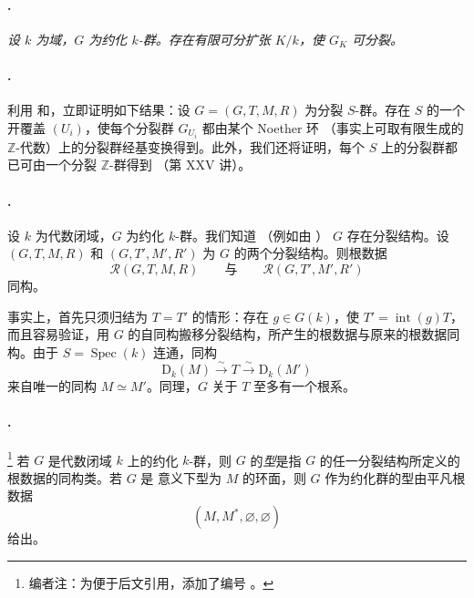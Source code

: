 \paragraph{.}
\textit{设 \(k\) 为域，\(G\) 为约化 \(k\)-群。存在有限可分扩张 \(K/k\)，使 \(G_K\) 可分裂。}

\paragraph{.}
利用  和，立即证明如下结果：设 \(G=(G,T,M,R)\) 为分裂 \(S\)-群。存在 \(S\) 的一个开覆盖 \((U_i)\)，使每个分裂群 \(G_{U_i}\) 都由某个 Noether 环 \textup{（事实上可取有限生成的 \(\mathbb Z\)-代数）}上的分裂群经基变换得到。此外，我们还将证明，每个 \(S\) 上的分裂群都已可由一个分裂 \(\mathbb Z\)-群得到 \textup{（第 XXV 讲）}。

\paragraph{.}
设 \(k\) 为代数闭域，\(G\) 为约化 \(k\)-群。我们知道 \textup{（例如由 ）} \(G\) 存在分裂结构。设 \((G,T,M,R)\) 和 \((G,T',M',R')\) 为 \(G\) 的两个分裂结构。则根数据
\[
  \mathcal R(G,T,M,R)
  \qquad\text{与}\qquad
  \mathcal R(G,T',M',R')
\]
同构。

事实上，首先只须归结为 \(T=T'\) 的情形：存在 \(g\in G(k)\)，使 \(T'=\operatorname{int}(g)T\)，而且容易验证，用 \(G\) 的自同构搬移分裂结构，所产生的根数据与原来的根数据同构。由于 \(S=\operatorname{Spec}(k)\) 连通，同构
\[
  \mathrm D_k(M)\xrightarrow{\sim}T
  \xrightarrow{\sim}\mathrm D_k(M')
\]
来自唯一的同构 \(M\simeq M'\)。同理，\(G\) 关于 \(T\) 至多有一个根系。

\paragraph{.}
\footnote{编者注：为便于后文引用，添加了编号 。}
若 \(G\) 是代数闭域 \(k\) 上的约化 \(k\)-群，则 \(G\) 的\emph{型}是指 \(G\) 的任一分裂结构所定义的根数据的同构类。若 \(G\) 是 意义下型为 \(M\) 的环面，则 \(G\) 作为约化群的型由平凡根数据
\[
  (M,M^*,\varnothing,\varnothing)
\]
给出。

